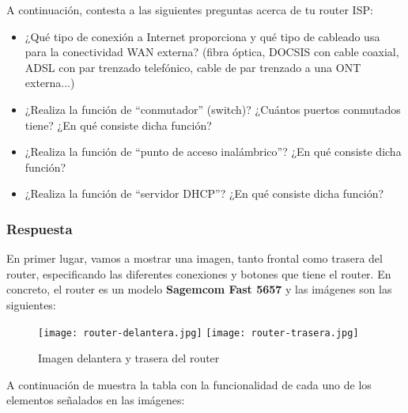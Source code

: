 A continuación, contesta a las siguientes preguntas acerca de tu router ISP:

\begin{itemize}
    \item ¿Qué tipo de conexión a Internet proporciona y qué tipo de cableado usa para la conectividad WAN externa? (fibra óptica, DOCSIS con cable coaxial, ADSL con par trenzado telefónico, cable de par trenzado a una ONT externa...)
    \item ¿Realiza la función de ``conmutador'' (switch)? ¿Cuántos puertos conmutados tiene? ¿En qué consiste dicha función?
    \item ¿Realiza la función de ``punto de acceso inalámbrico''? ¿En qué consiste dicha función?
    \item ¿Realiza la función de ``servidor DHCP''? ¿En qué consiste dicha función?
\end{itemize}

\subsubsection{Respuesta}
En primer lugar, vamos a mostrar una imagen, tanto frontal como trasera del router, especificando las diferentes conexiones y botones que tiene el router. En concreto, el router es un modelo \textbf{Sagemcom Fast 5657} y las imágenes son las siguientes:

    \begin{figure}[H]
    \centering
    \texttt{[image: router-delantera.jpg]} \hspace{3ex}
    \texttt{[image: router-trasera.jpg]}
    \caption{Imagen delantera y trasera del router}
\end{figure}

A continuación de muestra la tabla con la funcionalidad de cada uno de los elementos señalados en las imágenes:

